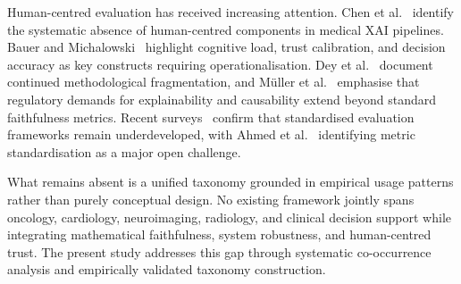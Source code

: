 Human-centred evaluation has received increasing attention. Chen et al.~\cite{chen2022explainable} identify the systematic absence of human-centred components in medical XAI pipelines. Bauer and Michalowski~\cite{bauer2025human} highlight cognitive load, trust calibration, and decision accuracy as key constructs requiring operationalisation. Dey et al.~\cite{dey2022human} document continued methodological fragmentation, and M{\"u}ller et al.~\cite{muller2022explainability} emphasise that regulatory demands for explainability and causability extend beyond standard faithfulness metrics. Recent surveys~\cite{houssein2025explainable,zhang2026comprehensive,Ahmed2026XAI} confirm that standardised evaluation frameworks remain underdeveloped, with Ahmed et al.~\cite{Ahmed2026XAI} identifying metric standardisation as a major open challenge.

What remains absent is a unified taxonomy grounded in empirical usage patterns rather than purely conceptual design. No existing framework jointly spans oncology, cardiology, neuroimaging, radiology, and clinical decision support while integrating mathematical faithfulness, system robustness, and human-centred trust. The present study addresses this gap through systematic co-occurrence analysis and empirically validated taxonomy construction.
